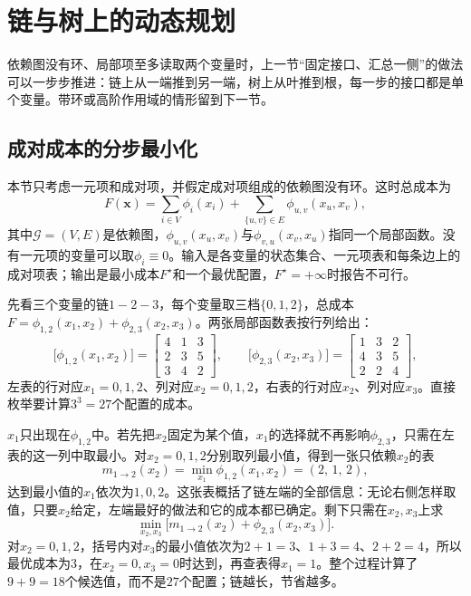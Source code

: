 
\section{链与树上的动态规划}
\label{sec:graph-tree-dp}

依赖图没有环、局部项至多读取两个变量时，上一节“固定接口、汇总一侧”的做法可以一步步推进：链上从一端推到另一端，树上从叶推到根，每一步的接口都是单个变量。带环或高阶作用域的情形留到下一节。

\subsection{成对成本的分步最小化}
\label{sec:graph-dp-tree-idea}

本节只考虑一元项和成对项，并假定成对项组成的依赖图没有环。这时总成本为
\begin{equation}
F(\bm x)=\sum_{i\in V}\phi_i(x_i)+\sum_{\{u,v\}\in E}\phi_{u,v}(x_u,x_v),
\label{eq:graph-dp-pairwise-cost}
\end{equation}
其中$\mathcal G=(V,E)$是依赖图，$\phi_{u,v}(x_u,x_v)$与$\phi_{v,u}(x_v,x_u)$指同一个局部函数。没有一元项的变量可以取$\phi_i\equiv0$。输入是各变量的状态集合、一元项表和每条边上的成对项表；输出是最小成本$F^\star$和一个最优配置，$F^\star=+\infty$时报告不可行。

先看三个变量的链$1-2-3$，每个变量取三档$\{0,1,2\}$，总成本$F=\phi_{1,2}(x_1,x_2)+\phi_{2,3}(x_2,x_3)$。两张局部函数表按行列给出：
\[
\bigl[\phi_{1,2}(x_1,x_2)\bigr]=\begin{bmatrix}4&1&3\\2&3&5\\3&4&2\end{bmatrix},\qquad
\bigl[\phi_{2,3}(x_2,x_3)\bigr]=\begin{bmatrix}1&3&2\\4&3&5\\2&2&4\end{bmatrix},
\]
左表的行对应$x_1=0,1,2$、列对应$x_2=0,1,2$，右表的行对应$x_2$、列对应$x_3$。直接枚举要计算$3^3=27$个配置的成本。

$x_1$只出现在$\phi_{1,2}$中。若先把$x_2$固定为某个值，$x_1$的选择就不再影响$\phi_{2,3}$，只需在左表的这一列中取最小。对$x_2=0,1,2$分别取列最小值，得到一张只依赖$x_2$的表
\[
m_{1\to2}(x_2)=\min_{x_1}\phi_{1,2}(x_1,x_2)=(2,\,1,\,2),
\]
达到最小值的$x_1$依次为$1,0,2$。这张表概括了链左端的全部信息：无论右侧怎样取值，只要$x_2$给定，左端最好的做法和它的成本都已确定。剩下只需在$x_2,x_3$上求
\[
\min_{x_2,x_3}\bigl[m_{1\to2}(x_2)+\phi_{2,3}(x_2,x_3)\bigr].
\]
对$x_2=0,1,2$，括号内对$x_3$的最小值依次为$2+1=3$、$1+3=4$、$2+2=4$，所以最优成本为$3$，在$x_2=0,x_3=0$时达到，再查表得$x_1=1$。整个过程计算了$9+9=18$个候选值，而不是$27$个配置；链越长，节省越多。

